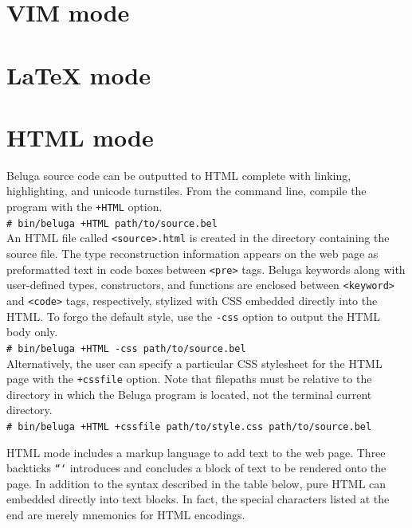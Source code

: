 \documentclass[11pt]{article}
\newcommand{\shellcmd}[1]{\\\indent\texttt{\# #1}\\}
\begin{document}
\section{VIM mode}

\section{LaTeX mode}

\section{HTML mode}
Beluga source code can be outputted to HTML complete with linking, highlighting, and unicode turnstiles. From the command line, compile the program with the \texttt{+HTML} option.
\shellcmd{bin/beluga +HTML path/to/source.bel}
An HTML file called \texttt{<source>.html} is created in the directory containing the source file. The type reconstruction information appears on the web page as preformatted text in code boxes between \texttt{<pre>} tags. Beluga keywords along with user-defined types, constructors, and functions are enclosed between \texttt{<keyword>} and \texttt{<code>} tags, respectively, stylized with CSS embedded directly into the HTML. To forgo the default style, use the \texttt{-css} option to output the HTML body only.
\shellcmd{bin/beluga +HTML -css path/to/source.bel}
Alternatively, the user can specify a particular CSS stylesheet for the HTML page with the \texttt{+cssfile} option. Note that filepaths must be relative to the directory in which the Beluga program is located, not the terminal current directory.  
\shellcmd{bin/beluga +HTML +cssfile path/to/style.css path/to/source.bel}

\newpage

HTML mode includes a markup language to add text to the web page. Three backticks \texttt{```} introduces and concludes a block of text to be rendered onto the page. In addition to the syntax described in the table below, pure HTML can embedded directly into text blocks. In fact, the special characters listed at the end are merely mnemonics for HTML encodings. \\
\end{document}
